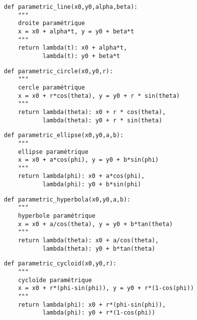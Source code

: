\begin{description}
	\noindent\begin{py}{15cm}
	\begin{lstlisting}[title={\bf Droite paramétrique}]
def parametric_line(x0,y0,alpha,beta):
    """
    droite paramétrique
    x = x0 + alpha*t, y = y0 + beta*t
    """
    return lambda(t): x0 + alpha*t, 
           lambda(t): y0 + beta*t
	\end{lstlisting}
	\end{py}

	\noindent\begin{py}{15cm}
	\begin{lstlisting}[title={\bf Cercle paramétrique}]
def parametric_circle(x0,y0,r):
    """
    cercle paramétrique
    x = x0 + r*cos(theta), y = y0 + r * sin(theta)
    """
    return lambda(theta): x0 + r * cos(theta), 
           lambda(theta): y0 + r * sin(theta)
	\end{lstlisting}
	\end{py}

	\noindent\begin{py}{15cm}
	\begin{lstlisting}[title={\bf Ellipse paramétrique}]
def parametric_ellipse(x0,y0,a,b):
    """
    ellipse paramétrique
    x = x0 + a*cos(phi), y = y0 + b*sin(phi)
    """
    return lambda(phi): x0 + a*cos(phi), 
           lambda(phi): y0 + b*sin(phi)
	\end{lstlisting}
	\end{py}

	\noindent\begin{py}{15cm}
	\begin{lstlisting}[title={\bf Hyperbole paramétrique}]
def parametric_hyperbola(x0,y0,a,b):
    """
    hyperbole paramétrique
    x = x0 + a/cos(theta), y = y0 + b*tan(theta)
    """
    return lambda(theta): x0 + a/cos(theta), 
           lambda(theta): y0 + b*tan(theta)
	\end{lstlisting}
	\end{py}

	\noindent\begin{py}{15cm}
	\begin{lstlisting}[title={\bf Cycloïde paramétrique}]
def parametric_cycloid(x0,y0,r):
    """
    cycloïde paramétrique
    x = x0 + r*(phi-sin(phi)), y = y0 + r*(1-cos(phi))
    """
    return lambda(phi): x0 + r*(phi-sin(phi)), 
           lambda(phi): y0 + r*(1-cos(phi))
	\end{lstlisting}
	\end{py}


\end{description}

